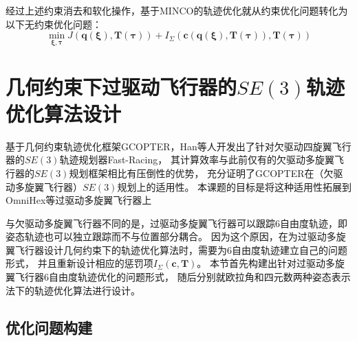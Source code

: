 经过上述约束消去和软化操作，基于MINCO的轨迹优化就从约束优化问题转化为以下无约束优化问题：
\begin{equation}
  \min_{\bm{\xi}, \bm{\tau}}
  J(\bm{q}(\bm{\xi}), \bm{T}(\bm{\tau})) + 
  I_{\Sigma}(\bm{c}(\bm{q}(\bm{\xi}), \bm{T}(\bm{\tau})), \bm{T}(\bm{\tau}))
  \label{equ:final_unconstrained_optimization_problem}
\end{equation}

\section{几何约束下过驱动飞行器的$SE(3)$轨迹优化算法设计} \label{sec:geometrically_constrained_SE3_planning_for_omnihex}
基于几何约束轨迹优化框架GCOPTER，Han等人开发出了针对欠驱动四旋翼飞行器的$SE(3)$轨迹规划器Fast-Racing\cite{2021Fast}，
其计算效率与此前仅有的欠驱动多旋翼飞行器的$SE(3)$规划框架\cite{liu2018search}相比有压倒性的优势，
充分证明了GCOPTER在（欠驱动多旋翼飞行器）$SE(3)$规划上的适用性。
本课题的目标是将这种适用性拓展到OmniHex等过驱动多旋翼飞行器上

与欠驱动多旋翼飞行器不同的是，过驱动多旋翼飞行器可以跟踪6自由度轨迹，即姿态轨迹也可以独立跟踪而不与位置部分耦合。
因为这个原因，在为过驱动多旋翼飞行器设计几何约束下的轨迹优化算法时，需要为6自由度轨迹建立自己的问题形式，
并且重新设计相应的惩罚项$I_{\Sigma}(\bm{c}, \bm{T})$。
本节首先构建出针对过驱动多旋翼飞行器6自由度轨迹优化的问题形式，
随后分别就欧拉角和四元数两种姿态表示法下的轨迹优化算法进行设计。

\subsection{优化问题构建}\label{subsec:problem_setup}
